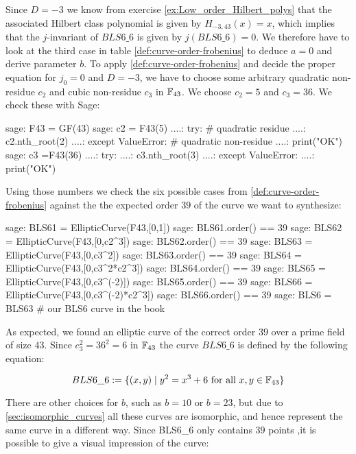 Since $D=-3$ we know from exercise \ref{ex:Low_order_Hilbert_polys} that the associated Hilbert class polynomial is given by $H_{-3,43}(x) = x$, which implies that the $j$-invariant of $BLS6\_6$ is given by $j(BLS6\_6)=0$. We therefore have to look at the third case in table \ref{def:curve-order-frobenius} to deduce $a=0$ and derive parameter $b$. To apply \ref{def:curve-order-frobenius} and decide the proper equation for $j_0=0$ and $D=-3$, we have to choose some arbitrary quadratic non-residue $c_2$ and cubic non-residue $c_3$ in $\mathbb{F}_{43}$. We choose $c_2 =5$ and $c_3=36$. We check these with Sage:
\begin{sagecommandline}
sage: F43 = GF(43)
sage: c2 = F43(5)
....: try: # quadratic residue
....:     c2.nth_root(2)
....: except ValueError: # quadratic non-residue
....:     print("OK") 
sage: c3 =F43(36)
....: try:
....:     c3.nth_root(3)
....: except ValueError:
....:     print("OK") 
\end{sagecommandline} 

Using those numbers we check the six possible cases from \ref{def:curve-order-frobenius} against the the expected order $39$ of the curve we want to synthesize:

\begin{sagecommandline}
sage: BLS61 = EllipticCurve(F43,[0,1])
sage: BLS61.order() == 39
sage: BLS62 = EllipticCurve(F43,[0,c2^3])
sage: BLS62.order() == 39
sage: BLS63 = EllipticCurve(F43,[0,c3^2])
sage: BLS63.order() == 39
sage: BLS64 = EllipticCurve(F43,[0,c3^2*c2^3])
sage: BLS64.order() == 39
sage: BLS65 = EllipticCurve(F43,[0,c3^(-2)])
sage: BLS65.order() == 39
sage: BLS66 = EllipticCurve(F43,[0,c3^(-2)*c2^3])
sage: BLS66.order() == 39
sage: BLS6 = BLS63 # our BLS6 curve in the book
\end{sagecommandline}
As expected, we found an elliptic curve of the correct order $39$ over a prime field of size $43$. Since $c_3^2=36^2=6$ in $\mathbb{F}_{43}$ the curve $BLS6\_6$ is defined by the following equation:

\begin{equation}
BLS6\_6 := \{(x,y)\;|\; y^2 = x^3 + 6 \text{ for all } x,y \in \mathbb{F}_{43}\}
\end{equation}

There are other choices for $b$, such as $b=10$ or $b=23$, but due to \ref{sec:isomorphic_curves} all these curves are isomorphic, and hence represent the same curve in a different way. Since BLS6\_6 only contains $39$ points ,it is possible to give a visual impression of the curve:

